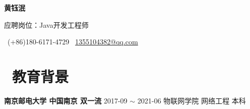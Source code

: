\documentclass[10pt, a4paper]{article}
\begin{document}

%

\centerline{\LARGE\bfseries{黄钰泯}}

\centerline{\normalsize{应聘岗位：Java开发工程师}}
\centerline{\normalsize{\faPhone\ (+86)180-6171-4729 \quad \faEnvelope\ \href{qqmail:1355104382@qq.com}{1355104382@qq.com}}}


\section{\color{CVBlue}\faGraduationCap\  教育背景}

\textbf{南京邮电大学 \quad 中国南京 \quad 双一流}  \hfill 2017-09 $\sim$ 2021-06
\newline\quad 物联网学院 \quad 网络工程 \quad 本科 
\end{document}
